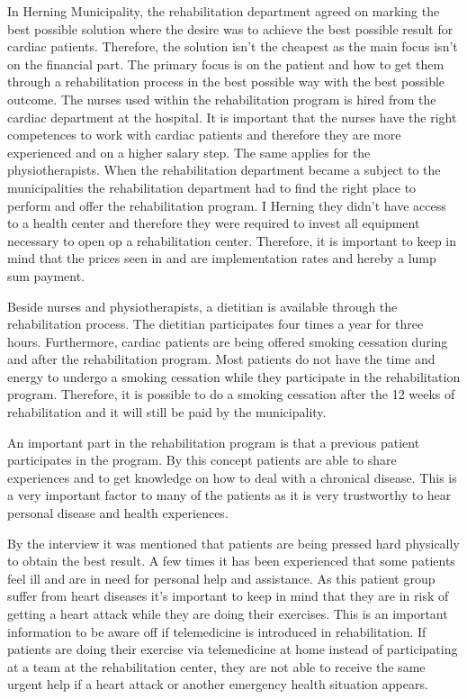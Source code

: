 In Herning Municipality, the rehabilitation department agreed on marking the best possible solution where the desire was to achieve the best possible result for cardiac patients. Therefore, the solution isn’t the cheapest as the main focus isn’t on the financial part. The primary focus is on the patient and how to get them through a rehabilitation process in the best possible way with the best possible outcome. The nurses used within the rehabilitation program is hired from the cardiac department at the hospital. It is important that the nurses have the right competences to work with cardiac patients and therefore they are more experienced and on a higher salary step. The same applies for the physiotherapists. When the rehabilitation department became a subject to the municipalities the rehabilitation department had to find the right place to perform and offer the rehabilitation program. I Herning they didn’t have access to a health center and therefore they were required to invest all equipment necessary to open op a rehabilitation center. Therefore, it is important to keep in mind that the prices seen in  and  are implementation rates and hereby a lump sum payment.   

Beside nurses and physiotherapists, a dietitian is available through the rehabilitation process. The dietitian participates four times a year for three hours. Furthermore, cardiac patients are being offered smoking cessation during and after the rehabilitation program. Most patients do not have the time and energy to undergo a smoking cessation while they participate in the rehabilitation program. Therefore, it is possible to do a smoking cessation after the 12 weeks of rehabilitation and it will still be paid by the municipality.   

An important part in the rehabilitation program is that a previous patient participates in the program. By this concept patients are able to share experiences and to get knowledge on how to deal with a chronical disease. This is a very important factor to many of the patients as it is very trustworthy to hear personal disease and health experiences. 

By the interview it was mentioned that patients are being pressed hard physically to obtain the best result. A few times it has been experienced that some patients feel ill and are in need for personal help and assistance. As this patient group suffer from heart diseases it’s important to keep in mind that they are in risk of getting a heart attack while they are doing their exercises. This is an important information to be aware off if telemedicine is introduced in rehabilitation. If patients are doing their exercise via telemedicine at home instead of participating at a team at the rehabilitation center, they are not able to receive the same urgent help if a heart attack or another emergency health situation appears.         

